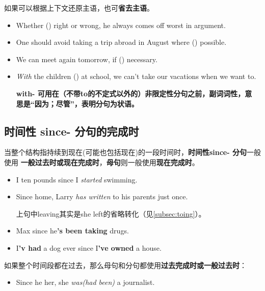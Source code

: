 如果可以根据上下文还原主语，也可\textbf{省去主语}。
\begin{itemize}
\item Whether () right or wrong, he always comes off worst in
  argument.

\item One should avoid taking a trip abroad in August where () possible.

\item We can meet again tomorrow, if () necessary.

\item \emph{With} the children () at school, we can't take our
  vacations when we want to.

  \textbf{with- 可用在（不带to的不定式以外的）非限定性分句之前，副词词性，意
    思是“因为；尽管”，表明分句为状语。}
\end{itemize}

\subsection{时间性 since- 分句的完成时}

当整个结构指持续到现在(可能也包括现在)的一段时间时，\textbf{时间性since- 分句}一般使用
\textbf{一般过去时或现在完成时}，\textbf{母句}则一般使用\textbf{现在完成时}。

\begin{itemize}
\item I  ten pounds since I \emph{started} swimming.
\item Since  home, Larry \emph{has written} to his parents just once.

  上句中leaving其实是she left的省略转化（见\cref{subsec:toing}）。

\item Max  since he\textbf{'s been taking} drugs.
\item I\textbf{'v had} a dog ever since I\textbf{'ve owned} a house.
\end{itemize}

如果整个时间段都在过去，那么母句和分句都使用\textbf{过去完成时或一般过去时}：
\begin{itemize}
\item Since he  her, she \emph{was(had been)} a journalist.
\end{itemize}

